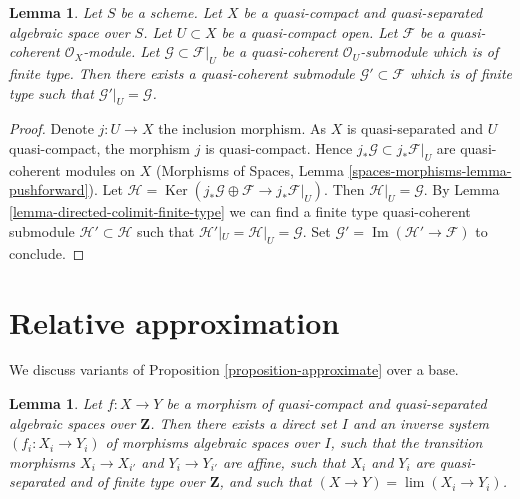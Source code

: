 \documentclass{stacks-project}
\theoremstyle{plain}
\newtheorem{lemma}[subsection]{Lemma}
\theoremstyle{definition}
\theoremstyle{remark}
\numberwithin{equation}{subsection}
\def\lim{\mathop{\mathrm{lim}}\nolimits}
\def\Ker{\mathop{\mathrm{Ker}}}
\def\Im{\mathop{\mathrm{Im}}}
\begin{document}
\begin{lemma}
\label{lemma-extend}
Let $S$ be a scheme.
Let $X$ be a quasi-compact and quasi-separated algebraic space over $S$.
Let $U \subset X$ be a quasi-compact open.
Let $\mathcal{F}$ be a quasi-coherent $\mathcal{O}_X$-module.
Let $\mathcal{G} \subset \mathcal{F}|_U$ be a quasi-coherent
$\mathcal{O}_U$-submodule which is of finite type. Then
there exists a quasi-coherent submodule $\mathcal{G}' \subset \mathcal{F}$
which is of finite type such that $\mathcal{G}'|_U = \mathcal{G}$.
\end{lemma}

\begin{proof}
Denote $j : U \to X$ the inclusion morphism. As $X$ is quasi-separated
and $U$ quasi-compact, the morphism $j$ is quasi-compact. Hence
$j_*\mathcal{G} \subset j_*\mathcal{F}|_U$ are quasi-coherent modules
on $X$ (Morphisms of Spaces, Lemma
\ref{spaces-morphisms-lemma-pushforward}).
Let $\mathcal{H} =
\Ker(j_*\mathcal{G} \oplus \mathcal{F} \to j_*\mathcal{F}|_U)$.
Then $\mathcal{H}|_U = \mathcal{G}$. By
Lemma \ref{lemma-directed-colimit-finite-type}
we can find a finite type quasi-coherent submodule
$\mathcal{H}' \subset \mathcal{H}$ such that
$\mathcal{H}'|_U = \mathcal{H}|_U = \mathcal{G}$.
Set $\mathcal{G}' = \Im(\mathcal{H}' \to \mathcal{F})$
to conclude.
\end{proof}









\section{Relative approximation}
\label{section-relative-approximation}

\noindent
We discuss variants of Proposition \ref{proposition-approximate}
over a base.

\begin{lemma}
\label{lemma-approximate-morphism}
Let $f : X \to Y$ be a morphism of quasi-compact and quasi-separated
algebraic spaces over $\mathbf{Z}$.
Then there exists a direct set $I$ and an inverse system $(f_i : X_i \to Y_i)$
of morphisms algebraic spaces over $I$, such that the transition morphisms
$X_i \to X_{i'}$ and $Y_i \to Y_{i'}$ are affine, such that $X_i$
and $Y_i$ are quasi-separated and of finite type over $\mathbf{Z}$, and
such that $(X \to Y) = \lim (X_i \to Y_i)$.
\end{lemma}
\end{document}

